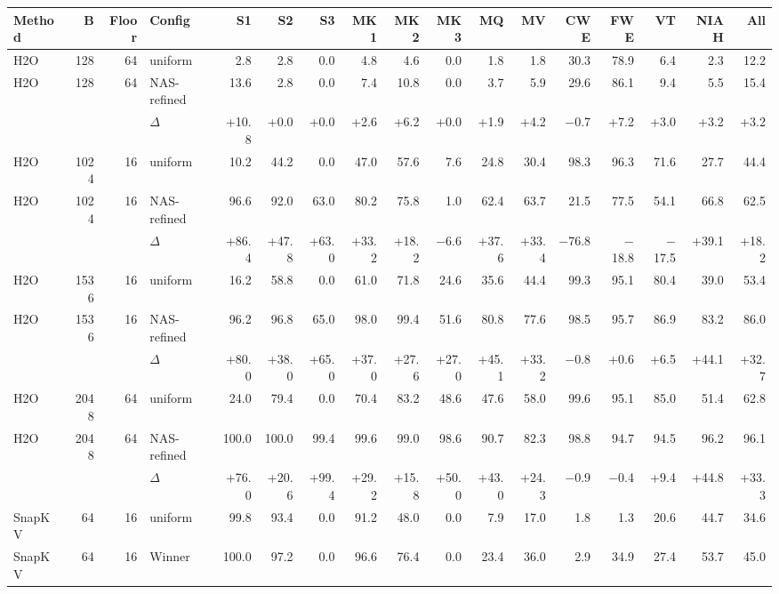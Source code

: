 \begin{table}[t]
  \centering
  \scriptsize
  \setlength{\tabcolsep}{2.5pt}
  \begin{tabular}{@{}l r r l r r r r r r r r r r r r r @{}}
    \toprule
    Method & B & Floor & Config & S1 & S2 & S3 & MK1 & MK2 & MK3 & MQ & MV & CWE & FWE & VT & NIAH & All \\
    \midrule
    H2O & 128 & 64 & uniform & 2.8 & 2.8 & 0.0 & 4.8 & 4.6 & 0.0 & 1.8 & 1.8 & 30.3 & 78.9 & 6.4 & 2.3 & 12.2 \\
    H2O & 128 & 64 & NAS-refined & 13.6 & 2.8 & 0.0 & 7.4 & 10.8 & 0.0 & 3.7 & 5.9 & 29.6 & 86.1 & 9.4 & 5.5 & 15.4 \\
     &  &  & $\Delta$ & +10.8 & +0.0 & +0.0 & +2.6 & +6.2 & +0.0 & +1.9 & +4.2 & $-$0.7 & +7.2 & +3.0 & +3.2 & +3.2 \\
    \midrule
    H2O & 1024 & 16 & uniform & 10.2 & 44.2 & 0.0 & 47.0 & 57.6 & 7.6 & 24.8 & 30.4 & 98.3 & 96.3 & 71.6 & 27.7 & 44.4 \\
    H2O & 1024 & 16 & NAS-refined & 96.6 & 92.0 & 63.0 & 80.2 & 75.8 & 1.0 & 62.4 & 63.7 & 21.5 & 77.5 & 54.1 & 66.8 & 62.5 \\
     &  &  & $\Delta$ & +86.4 & +47.8 & +63.0 & +33.2 & +18.2 & $-$6.6 & +37.6 & +33.4 & $-$76.8 & $-$18.8 & $-$17.5 & +39.1 & +18.2 \\
    \midrule
    H2O & 1536 & 16 & uniform & 16.2 & 58.8 & 0.0 & 61.0 & 71.8 & 24.6 & 35.6 & 44.4 & 99.3 & 95.1 & 80.4 & 39.0 & 53.4 \\
    H2O & 1536 & 16 & NAS-refined & 96.2 & 96.8 & 65.0 & 98.0 & 99.4 & 51.6 & 80.8 & 77.6 & 98.5 & 95.7 & 86.9 & 83.2 & 86.0 \\
     &  &  & $\Delta$ & +80.0 & +38.0 & +65.0 & +37.0 & +27.6 & +27.0 & +45.1 & +33.2 & $-$0.8 & +0.6 & +6.5 & +44.1 & +32.7 \\
    \midrule
    H2O & 2048 & 64 & uniform & 24.0 & 79.4 & 0.0 & 70.4 & 83.2 & 48.6 & 47.6 & 58.0 & 99.6 & 95.1 & 85.0 & 51.4 & 62.8 \\
    H2O & 2048 & 64 & NAS-refined & 100.0 & 100.0 & 99.4 & 99.6 & 99.0 & 98.6 & 90.7 & 82.3 & 98.8 & 94.7 & 94.5 & 96.2 & 96.1 \\
     &  &  & $\Delta$ & +76.0 & +20.6 & +99.4 & +29.2 & +15.8 & +50.0 & +43.0 & +24.3 & $-$0.9 & $-$0.4 & +9.4 & +44.8 & +33.3 \\
    \midrule
    SnapKV & 64 & 16 & uniform & 99.8 & 93.4 & 0.0 & 91.2 & 48.0 & 0.0 & 7.9 & 17.0 & 1.8 & 1.3 & 20.6 & 44.7 & 34.6 \\
    SnapKV & 64 & 16 & Winner & 100.0 & 97.2 & 0.0 & 96.6 & 76.4 & 0.0 & 23.4 & 36.0 & 2.9 & 34.9 & 27.4 & 53.7 & 45.0 \\

\end{tabular}
\end{table}
